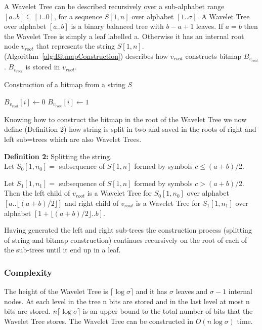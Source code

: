 		
A Wavelet Tree can be described recursively over a sub-alphabet range $[a .. b] \subseteq [1 .. 0]$, for a sequence $S[1,n]$ over alphabet $[1 .. \sigma]$. 
A Wavelet Tree over alphabet $[a .. b]$ is a binary balanced tree with $b - a + 1$ leaves. If $a = b$ then the Wavelet Tree is simply a leaf labelled a. 
Otherwise it has an internal root node $v_{root}$ that represents the string $S[1,n]$. 
 (Algorithm~\ref{alg:BitmapConstruction}) describes how $v_{root}$ constructs bitmap $B_{v_{root}}$. $B_{v_{root}}$ is stored in $v_{root}$.

\begin{algorithm}
\caption{Construction of a bitmap from a string \textit{S}}
\label{alg:BitmapConstruction}
\begin{algorithmic}
	\State $B_{v_{root}}[i] \gets 0$
\Else
	\State $B_{v_{root}}[i] \gets 1$
\EndIf
\EndFunction
\end{algorithmic}
\end{algorithm}


Knowing how to construct the bitmap in the root of the Wavelet Tree we now define (Definition 2) how string is split in two and saved in the roots of right and left sub=trees which are also Wavelet Trees.


\vspace{0.5 cm}
\begin{mdframed}[nobreak]
\textbf{Definition 2:} Splitting the string. \\

\noindent
Let $S_0[1,n_0] =$ subsequence of $S[1,n]$ formed by symbols $c \leq (a + b)$/2.

\noindent
Let $S_1[1,n_1] =$ subsequence of $S[1,n]$ formed by symbols $c > (a + b)$/2.
\\ \linebreak
\noindent
Then the left child of $v_{root}$ is a Wavelet Tree for $S_0[1,n_0]$ over alphabet $[a .. \lfloor (a + b)/2 \rfloor]$ and right child of $v_{root}$ is a Wavelet Tree for $S_1[1,n_1]$ over alphabet $[1 + \lfloor (a + b)/2 \rfloor .. b]$. 
\end{mdframed}
\vspace{0.5 cm}

Having generated the left and right sub-trees the construction process (splitting of string and bitmap construction) continues recursively on the root of each of the sub-trees until it end up in a leaf.

\subsubsection{Complexity}
The height of the Wavelet Tree is  $\lceil \log \sigma \rceil$ and it has $\sigma$ leaves and $\sigma - 1$ internal nodes. 
At each level in the tree n bits are stored and in the last level at most n bits are stored. $n \lceil \log \sigma \rceil$ is an upper bound to the total number of bits that the Wavelet Tree stores. 
The Wavelet Tree can be constructed in $O(n \log \sigma)$ time.

